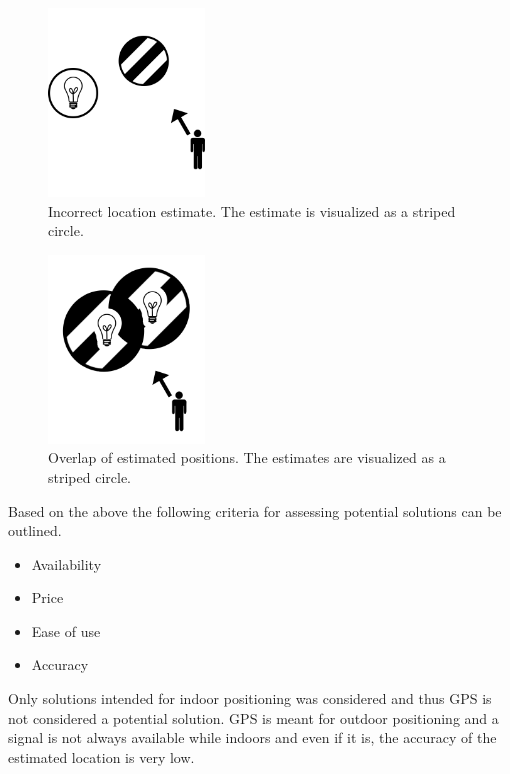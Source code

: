 \begin{figure}[h]
    \centering
    \includegraphics[height=5cm]{images/incorrect-positioning-estimate.png}
    \caption{Incorrect location estimate. The estimate is visualized as a striped circle.}
    \label{fig:indoor-positioning:incorrect}
\end{figure}

\begin{figure}[h]
    \centering
    \includegraphics[height=5cm]{images/positioning-overlap.png}
    \caption{Overlap of estimated positions. The estimates are visualized as a striped circle.}
    \label{fig:indoor-positioning:overlap}
\end{figure}

Based on the above the following criteria for assessing potential solutions can be outlined.

\begin{itemize}
    \item Availability
    \item Price
    \item Ease of use
    \item Accuracy
\end{itemize}

Only solutions intended for indoor positioning was considered and thus GPS is not considered a potential solution. 
GPS is meant for outdoor positioning and a signal is not always available while indoors and even if it is, the accuracy of the estimated location is very low.

